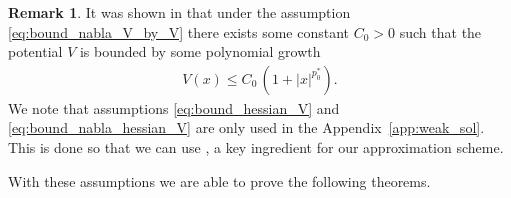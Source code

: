 \documentclass[reqno, 11pt]{amsart}
\numberwithin{equation}{section}
\theoremstyle{definition}
\newtheorem{rem}[thm]{Remark}
\begin{document}
\begin{rem}
    \label{rem:poly_growth_V}
    It was shown in \cite[Remark 2.3]{lu_lu_nolen_2019_scaling} that under the assumption \eqref{eq:bound_nabla_V_by_V} there exists some constant $C_0>0$ such that the potential $V$ is bounded by some polynomial growth
    \begin{align}
        \label{eq:V_poly_gorwth}
        V(x)\leq C_0\,(1+|x|^{p_0^\ast}).
    \end{align}
    We note that assumptions \eqref{eq:bound_hessian_V} and \eqref{eq:bound_nabla_hessian_V} are only used in the Appendix~\ref{app:weak_sol}. This is done so that we can use \cite[Theorem 2.4]{lu_lu_nolen_2019_scaling}, a key ingredient for our approximation scheme.
\end{rem}

With these assumptions we are able to prove the following theorems.
\end{document}
